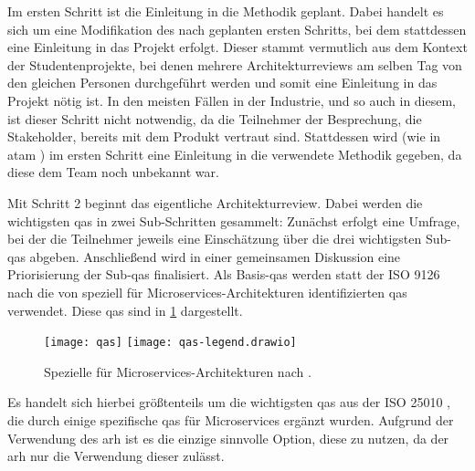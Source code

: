 Im ersten Schritt ist die Einleitung in die Methodik geplant.
Dabei handelt es sich um eine Mo\-di\-fi\-ka\-ti\-on des nach  geplanten ersten Schritts, bei dem stattdessen eine Einleitung in das Projekt erfolgt.
Dieser stammt vermutlich aus dem Kontext der Studentenprojekte, bei denen mehrere Architekturreviews am selben Tag von den gleichen Personen durchgeführt werden und somit eine Einleitung in das Projekt nötig ist.
In den meisten Fällen in der Industrie, und so auch in diesem, ist dieser Schritt nicht notwendig, da die Teilnehmer der Besprechung, die Stakeholder, bereits mit dem Produkt vertraut sind.
Stattdessen wird (wie in \gls{atam} \cite{kazman_2000}) im ersten Schritt eine Einleitung in die verwendete Methodik gegeben, da diese dem Team noch unbekannt war.

Mit Schritt 2 beginnt das eigentliche Architekturreview.
Dabei werden die wichtigsten \glspl{qa} in zwei Sub-Schritten gesammelt:
Zunächst erfolgt eine Umfrage, bei der die Teilnehmer jeweils eine Einschätzung über die drei wichtigsten Sub-\glspl{qa} abgeben.
Anschließend wird in einer gemeinsamen Diskussion eine Priorisierung der Sub-\glspl{qa} finalisiert.
Als Basis-\glspl{qa} werden statt der ISO 9126~\cite{ISO-9126} nach  die von  speziell für Microservices-Architekturen identifizierten \glspl{qa} verwendet.
Diese \glspl{qa} sind in \cref{fig:qas} dargestellt.
\begin{figure}[!h]
	\centering
	\texttt{[image: qas]}
	\texttt{[image: qas-legend.drawio]}
	\caption[Spezielle  für Microservices-Architekturen]{
		Spezielle  für Microservices-Architekturen nach .
	}
	\label{fig:qas}
\end{figure}
Es handelt sich hierbei größtenteils um die wichtigsten \glspl{qa} aus der ISO 25010 \cite{ISO-25010}, die durch einige spezifische \glspl{qa} für Microservices ergänzt wurden.
Aufgrund der Verwendung des \gls{arh} ist es die einzige sinnvolle Option, diese zu nutzen, da der \gls{arh} nur die Verwendung dieser zulässt.

